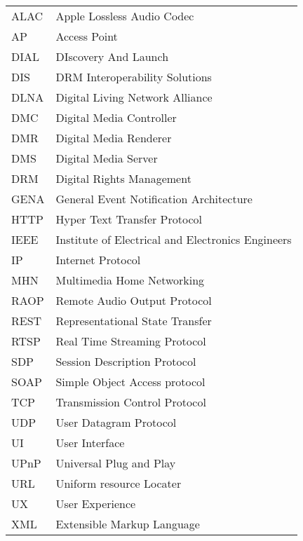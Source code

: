 



\begin{tabular}{ll}
ALAC	& Apple Lossless Audio Codec \\
AP	   & Access Point \\
DIAL	   & DIscovery And Launch \label{dial_shortfor} \\
DIS		& DRM Interoperability Solutions\\
DLNA       & Digital Living Network Alliance\label{dlna_shortfor} \\ 
DMC        & Digital Media Controller \\
DMR        & Digital Media Renderer \\
DMS        & Digital Media Server \\
DRM        & Digital Rights Management \\ 
GENA		& General Event Notification Architecture\\
HTTP       & Hyper Text Transfer Protocol \\
IEEE		& Institute of Electrical and Electronics Engineers \\
IP		& Internet Protocol \\
MHN		 & Multimedia Home Networking \\
RAOP	   & Remote Audio Output Protocol\\
REST		& Representational State Transfer\\
RTSP       & Real Time Streaming Protocol \\
SDP    	& Session Description Protocol\\ 
SOAP		& Simple Object Access protocol\\
TCP		& Transmission Control Protocol \\
UDP		& User Datagram Protocol \\
UI		& User Interface \\
UPnP	   & Universal Plug and Play \label{upnp_shortfor} \\
URL		& Uniform resource Locater \\
UX		& User Experience \\
XML		& Extensible Markup Language \\

\end{tabular}

